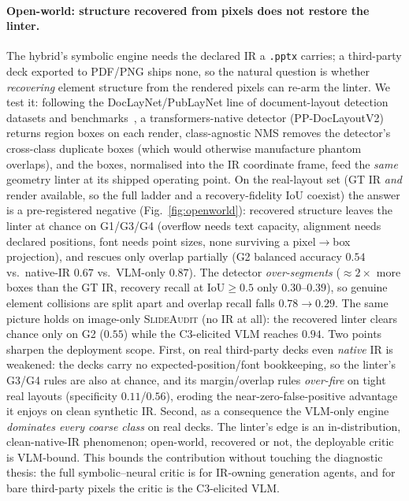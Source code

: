 \documentclass[10pt]{article}
\newcommand{\g}[1]{\textsf{#1}}        %
\begin{document}
\paragraph{Open-world: structure recovered from pixels does not restore the linter.}
The hybrid's symbolic engine needs the declared IR a \texttt{.pptx} carries; a third-party deck exported to
PDF/PNG ships none, so the natural question is whether \emph{recovering} element structure from the rendered
pixels can re-arm the linter. We test it: following the DocLayNet/PubLayNet line of document-layout
detection datasets and benchmarks~\cite{doclaynet,publaynet}, a transformers-native detector (PP-DocLayoutV2)
returns region boxes on each render, class-agnostic NMS removes the detector's cross-class duplicate boxes
(which would otherwise manufacture phantom overlaps), and the boxes, normalised into the IR coordinate
frame, feed the \emph{same} geometry linter at its shipped operating point. On the real-layout set
(GT IR \emph{and} render available, so the full ladder and a recovery-fidelity IoU coexist) the answer is a
pre-registered negative (Fig.~\ref{fig:openworld}): recovered structure leaves the linter at chance on
\g{G1}/\g{G3}/\g{G4} (overflow needs text capacity, alignment needs declared positions, font needs point
sizes, none surviving a pixel$\to$box projection), and rescues only overlap partially (\g{G2} balanced accuracy
$0.54$ vs.\ native-IR $0.67$ vs.\ VLM-only $0.87$). The detector \emph{over-segments} ($\approx2\times$ more
boxes than the GT IR, recovery recall at IoU${\geq}0.5$ only $0.30$--$0.39$), so genuine element collisions are
split apart and overlap recall falls $0.78\to0.29$. The same picture holds on image-only \textsc{SlideAudit}
(no IR at all): the recovered linter clears chance only on \g{G2} ($0.55$) while the C3-elicited VLM reaches
$0.94$. Two points sharpen the deployment scope. First, on real third-party decks even \emph{native} IR is
weakened: the decks carry no expected-position/font bookkeeping, so the linter's \g{G3}/\g{G4} rules are also at
chance, and its margin/overlap rules \emph{over-fire} on tight real layouts (specificity $0.11$/$0.56$), eroding
the near-zero-false-positive advantage it enjoys on clean synthetic IR. Second, as a consequence the
VLM-only engine \emph{dominates every coarse class} on real decks. The linter's edge is an in-distribution,
clean-native-IR phenomenon; open-world, recovered or not, the deployable critic is VLM-bound. This bounds the
contribution without touching the diagnostic thesis: the full symbolic--neural critic is for IR-owning generation
agents, and for bare third-party pixels the critic is the C3-elicited VLM.
\end{document}
